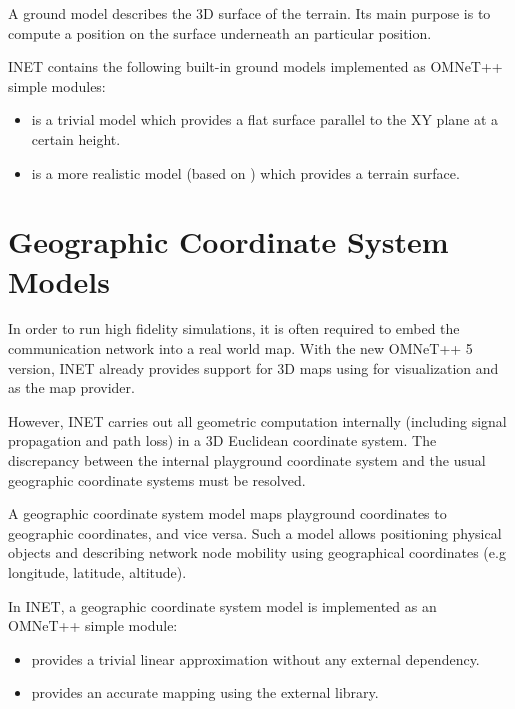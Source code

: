 A ground model describes the 3D surface of the terrain. Its main purpose is
to compute a position on the surface underneath an particular position.

INET contains the following built-in ground models implemented as
OMNeT++ simple modules:

\begin{itemize}
    \item {} is a trivial model which provides a flat surface parallel to the XY plane at a certain height.
    \item {} is a more realistic model (based on ) which provides a terrain surface.
\end{itemize}

\section{Geographic Coordinate System Models}

In order to run high fidelity simulations, it is often required to embed
the communication network into a real world map. With the new OMNeT++ 5
version, INET already provides support for 3D maps using
 for visualization and  as the map
provider.

However, INET carries out all geometric computation internally (including
signal propagation and path loss) in a 3D Euclidean coordinate system. The
discrepancy between the internal playground coordinate system and the usual
geographic coordinate systems must be resolved.

A geographic coordinate system model maps playground coordinates to
geographic coordinates, and vice versa. Such a model allows positioning
physical objects and describing network node mobility using geographical
coordinates (e.g longitude, latitude, altitude).

In INET, a geographic coordinate system model is implemented as an OMNeT++
simple module:

\begin{itemize}
    \item {} provides a trivial linear approximation without any external dependency.
    \item {} provides an accurate mapping using the external  library.
\end{itemize}

